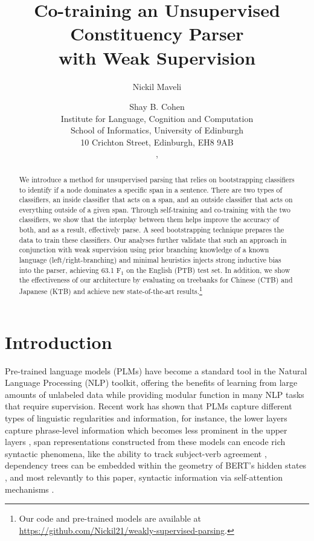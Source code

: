 \documentclass[11pt]{article}
\title{Co-training an Unsupervised Constituency Parser \\ with Weak Supervision}
\author{Nickil Maveli \and Shay B. Cohen \\
Institute for Language, Cognition and Computation \\
School of Informatics, University of Edinburgh \\
10 Crichton Street, Edinburgh, EH8 9AB \\
\eml{n.maveli@sms.ed.ac.uk},
\eml{scohen@inf.ed.ac.uk}}
\begin{document}
\maketitle
\begin{abstract}
We introduce a method for unsupervised parsing that relies on bootstrapping classifiers to identify if a node dominates a specific span in a sentence. There are two types of classifiers, an inside classifier that acts on a span, and an outside classifier that acts on everything outside of a given span. Through self-training and co-training with the two classifiers, we show that the interplay between them helps improve the accuracy of both, and as a result, effectively parse. A seed bootstrapping technique prepares the data to train these classifiers. Our analyses further validate that such an approach in conjunction with weak supervision using prior branching knowledge of a known language (left/right-branching) and minimal heuristics injects strong inductive bias into the parser, achieving 63.1 F$_1$ on the English (PTB) test set. In addition, we show the effectiveness of our architecture by evaluating on treebanks for Chinese (CTB) and Japanese (KTB) and achieve new state-of-the-art results.\footnote{Our code and pre-trained models are available at\\
\url{https://github.com/Nickil21/weakly-supervised-parsing}.}
\end{abstract}


\section{Introduction}
\label{sec:intro}

Pre-trained language models (PLMs) have become a standard tool in the Natural Language Processing (NLP) toolkit, offering the benefits of learning from large amounts of unlabeled data while providing modular function in many NLP tasks that require supervision. Recent work has shown that PLMs capture different types of linguistic regularities and information, for instance, the lower layers capture phrase-level information which becomes less prominent in the upper layers \citep{jawahar-etal-2019-bert}, span representations constructed from these models can encode rich syntactic phenomena, like the ability to track subject-verb agreement \citep{Goldberg2019AssessingBS}, dependency trees can be embedded within the geometry of BERT's hidden states \citep{hewitt-manning-2019-structural}, and most relevantly to this paper, syntactic information via self-attention mechanisms \citep{wang-etal-2019-tree, Kim2020Are}. 
\end{document}
